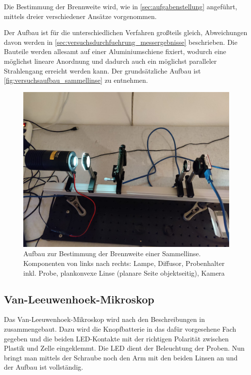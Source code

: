 \documentclass[ngerman]{scrartcl}
\begin{document}
Die Bestimmung der Brennweite wird, wie in \autoref{sec:aufgabenstellung} angeführt, mittels dreier verschiedener Ansätze vorgenommen.

Der Aufbau ist für die unterschiedlichen Verfahren großteils gleich, Abweichungen davon werden in \autoref{sec:versuchsdurchfuehrung_messergebnisse} beschrieben. Die Bauteile werden allesamt auf einer Aluminiumschiene fixiert, wodurch eine möglichst lineare Anordnung und dadurch auch ein möglichst paralleler Strahlengang erreicht werden kann.
Der grundsätzliche Aufbau ist \autoref{fig:versuchsaufbau_sammellinse} zu entnehmen.
%
\begin{figure}[H]
    \centering
    \begin{samepage}
        \includegraphics[width=\linewidth]{fig/versuch1.jpeg}
        \caption[Aufbau Brennweite einer Sammellinse bestimmen]{Aufbau zur Bestimmung der Brennweite einer Sammellinse. Komponenten von links nach rechts: Lampe, Diffusor, Probenhalter inkl. Probe, plankonvexe Linse (planare Seite objektseitig), Kamera}
        \label{fig:versuchsaufbau_sammellinse}
    \end{samepage}
\end{figure}


\subsection{Van-Leeuwenhoek-Mikroskop}
\label{subsec:versuchsanordnung_vanleeuwenhoek}

Das Van-Leeuwenhoek-Mikroskop wird nach den Beschreibungen in \cite{ref:angabe} zusammengebaut. Dazu wird die Knopfbatterie in das dafür vorgesehene Fach gegeben und die beiden LED-Kontakte mit der richtigen Polarität zwischen Plastik und Zelle eingeklemmt. Die LED dient der Beleuchtung der Proben. Nun bringt man mittels der Schraube noch den Arm mit den beiden Linsen an und der Aufbau ist vollständig.
\end{document}
